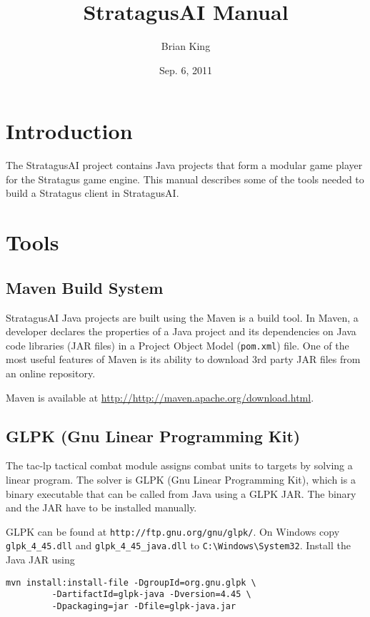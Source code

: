 \documentclass{article}
\title{StratagusAI Manual}
\date{Sep. 6, 2011}
\author{Brian King}
\begin{document}
\maketitle

\section*{Introduction}
The StratagusAI project contains Java projects that form a modular game player for the Stratagus game engine.  This manual describes 
some of the tools needed to build a Stratagus client in StratagusAI.

\section*{Tools}

\subsection*{Maven Build System}
StratagusAI Java projects are built using the Maven is a build tool.  In Maven, a developer declares the properties of a Java project and its dependencies 
on Java code libraries (JAR files) in a Project Object Model (\verb+pom.xml+) file.  One of the most useful features of Maven is its ability to 
download 3rd party JAR files from an online repository.

Maven is available at \url{http://http://maven.apache.org/download.html}.

\subsection*{GLPK (Gnu Linear Programming Kit)}

The tac-lp tactical combat module assigns combat units to targets by solving a linear program. The solver is GLPK (Gnu Linear Programming Kit),
which is a binary executable that can be called from Java using a GLPK JAR.  The binary and the JAR have to be installed manually.

GLPK can be found at \verb+http://ftp.gnu.org/gnu/glpk/+.  On Windows copy \verb+glpk_4_45.dll+ and \verb+glpk_4_45_java.dll+
to \verb+C:\Windows\System32+. Install the Java JAR using

\begin{verbatim}
mvn install:install-file -DgroupId=org.gnu.glpk \
         -DartifactId=glpk-java -Dversion=4.45 \
         -Dpackaging=jar -Dfile=glpk-java.jar
\end{verbatim}
\end{document}
